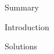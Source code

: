 {Summary}

\graphicspath{{./1-Introduction/Images/}}
{Introduction}

\graphicspath{{./2-Solutions/Images/}}
{Solutions}
